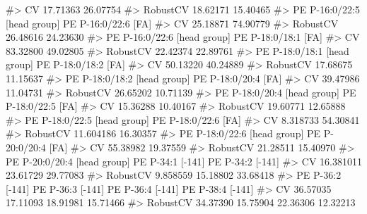 \documentclass[
  letterpaper,
  DIV=11,
  numbers=noendperiod]{scrreprt}
\newenvironment{Shaded}{\begin{snugshade}}{\end{snugshade}}
\newcommand{\CommentTok}[1]{\textcolor[rgb]{0.37,0.37,0.37}{#1}}
\begin{document}
\begin{Shaded}
\begin{Highlighting}[]
\CommentTok{\#\textgreater{} CV                          17.71363            26.07754}
\CommentTok{\#\textgreater{} RobustCV                    18.62171            15.40465}
\CommentTok{\#\textgreater{}          PE P{-}16:0/22:5 [head group] PE P{-}16:0/22:6 [FA]}
\CommentTok{\#\textgreater{} CV                          25.18871            74.90779}
\CommentTok{\#\textgreater{} RobustCV                    26.48616            24.23630}
\CommentTok{\#\textgreater{}          PE P{-}16:0/22:6 [head group] PE P{-}18:0/18:1 [FA]}
\CommentTok{\#\textgreater{} CV                          83.32800            49.02805}
\CommentTok{\#\textgreater{} RobustCV                    22.42374            22.89761}
\CommentTok{\#\textgreater{}          PE P{-}18:0/18:1 [head group] PE P{-}18:0/18:2 [FA]}
\CommentTok{\#\textgreater{} CV                          50.13220            40.24889}
\CommentTok{\#\textgreater{} RobustCV                    17.68675            11.15637}
\CommentTok{\#\textgreater{}          PE P{-}18:0/18:2 [head group] PE P{-}18:0/20:4 [FA]}
\CommentTok{\#\textgreater{} CV                          39.47986            11.04731}
\CommentTok{\#\textgreater{} RobustCV                    26.65202            10.71139}
\CommentTok{\#\textgreater{}          PE P{-}18:0/20:4 [head group] PE P{-}18:0/22:5 [FA]}
\CommentTok{\#\textgreater{} CV                          15.36288            10.40167}
\CommentTok{\#\textgreater{} RobustCV                    19.60771            12.65888}
\CommentTok{\#\textgreater{}          PE P{-}18:0/22:5 [head group] PE P{-}18:0/22:6 [FA]}
\CommentTok{\#\textgreater{} CV                          8.318733            54.30841}
\CommentTok{\#\textgreater{} RobustCV                   11.604186            16.30357}
\CommentTok{\#\textgreater{}          PE P{-}18:0/22:6 [head group] PE P{-}20:0/20:4 [FA]}
\CommentTok{\#\textgreater{} CV                          55.38982            19.37559}
\CommentTok{\#\textgreater{} RobustCV                    21.28511            15.40970}
\CommentTok{\#\textgreater{}          PE P{-}20:0/20:4 [head group] PE P{-}34:1 [{-}141] PE P{-}34:2 [{-}141]}
\CommentTok{\#\textgreater{} CV                         16.381011         23.61729         29.77083}
\CommentTok{\#\textgreater{} RobustCV                    9.858559         15.18802         33.68418}
\CommentTok{\#\textgreater{}          PE P{-}36:2 [{-}141] PE P{-}36:3 [{-}141] PE P{-}36:4 [{-}141] PE P{-}38:4 [{-}141]}
\CommentTok{\#\textgreater{} CV               36.57035         17.11093         18.91981         15.71466}
\CommentTok{\#\textgreater{} RobustCV         34.37390         15.75904         22.36306         12.32213}

\end{Highlighting}
\end{Shaded}
\end{document}
